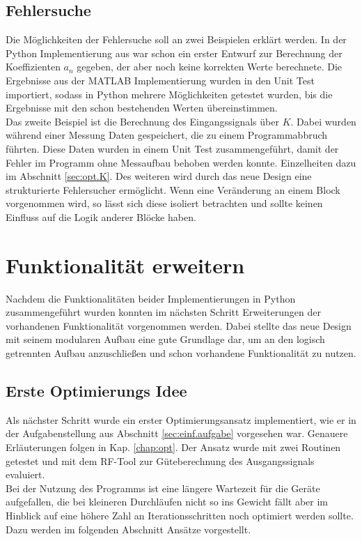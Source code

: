 \documentclass[../Report.tex]{subfiles}
\begin{document}
\subsection*{Fehlersuche}
\label{sec:vorg.fehlersuche}
Die Möglichkeiten der Fehlersuche soll an zwei Beispielen erklärt werden. In der Python Implementierung aus \cite{PJS_Denys} war schon ein erster Entwurf zur Berechnung der Koeffizienten $a_n$ gegeben, der aber noch keine korrekten Werte berechnete. Die Ergebnisse aus der MATLAB Implementierung wurden in den Unit Test importiert, sodass in Python mehrere Möglichkeiten getestet wurden, bis die Ergebnisse mit den schon bestehenden Werten übereinstimmen. \\
Das zweite Beispiel ist die Berechnung des Eingangssignals über $K$. Dabei wurden während einer Messung Daten gespeichert, die zu einem Programmabbruch führten. Diese Daten wurden in einem Unit Test zusammengeführt, damit der Fehler im Programm ohne Messaufbau behoben werden konnte. Einzelheiten dazu im Abschnitt \ref{sec:opt.K}.
Des weiteren wird durch das neue Design eine strukturierte Fehlersucher ermöglicht. Wenn eine Veränderung an einem Block vorgenommen wird, so lässt sich diese isoliert betrachten und sollte keinen Einfluss auf die Logik anderer Blöcke haben.

\section[Funktionalität erweitern]{Funktionalität erweitern}
\label{sec:vorg.erweiterung}
Nachdem die Funktionalitäten beider Implementierungen in Python zusammengeführt wurden konnten im nächsten Schritt Erweiterungen der vorhandenen Funktionalität vorgenommen werden. Dabei stellte das neue Design mit seinem modularen Aufbau eine gute Grundlage dar, um an den logisch getrennten Aufbau anzuschließen und schon vorhandene Funktionalität zu nutzen.
\subsection{Erste Optimierungs Idee}
\label{sec:vorg.optimierung}
Als nächster Schritt wurde ein erster Optimierungsansatz implementiert, wie er in der Aufgabenstellung aus Abschnitt \ref{sec:einf.aufgabe} vorgesehen war. Genauere Erläuterungen folgen in Kap. \ref{chap:opt}. Der Ansatz wurde mit zwei Routinen getestet und mit dem RF-Tool \cite{RF-Tool} zur Güteberechnung des Ausgangssignals evaluiert. \\
Bei der Nutzung des Programms ist eine längere Wartezeit für die Geräte aufgefallen, die bei kleineren Durchläufen nicht so ins Gewicht fällt aber im Hinblick auf eine höhere Zahl an Iterationsschritten noch optimiert werden sollte. Dazu werden im folgenden Abschnitt Ansätze vorgestellt.
\end{document}
